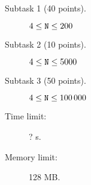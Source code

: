 \documentclass{boi2014}
\newcommand{\param}[1]{{\tt #1}}
\newcommand{\N}{\param{N}}
\begin{document}
    \Scoring

    \begin{description}
        \item[Subtask 1 (40 points).] $4 \le \N{} \le 200$
        \item[Subtask 2 (10 points).] $4 \le \N{} \le 5000$
        \item[Subtask 3 (50 points).] $4 \le \N{} \le 100\,000$
    \end{description}

    \Constraints

    \begin{description}
        \item[Time limit:] ? s.
        \item[Memory limit:] 128 MB.
    \end{description}
\end{document}
